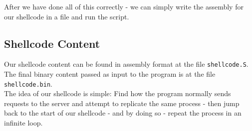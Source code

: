 \documentclass{article}
\begin{document}
After we have done all of this correctly - we can simply write
the assembly for our shellcode in a file and run the script.\\

\label{shellcont}
\subsection{Shellcode Content}
Our shellcode content can be found
in assembly format at the file \texttt{shellcode.S}.\\
The final binary content passed as input to the program is at the file \texttt{shellcode.bin}.\\

The idea of our shellcode is simple: Find how the program
normally sends requests to the server and attempt to replicate the same process
- then jump back to the start of our shellcode - and by doing so -
repeat the process in an infinite loop.\\
\end{document}
